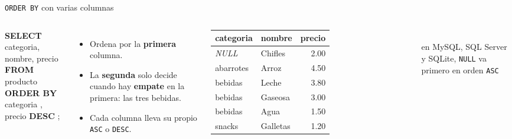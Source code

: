 \documentclass[aspectratio=169,10pt,c]{beamer}
\newcommand{\kw}[1]{\textcolor{utpRojo}{\textbf{#1}}}
\newcommand{\nuevo}[1]{{%
  \setlength{\fboxsep}{1.2pt}%
  \begingroup
  \renewcommand{\kw}[1]{\textcolor{utpNegro}{\textbf{##1}}}%
  \colorbox{yellow!45}{\textcolor{utpNegro}{#1}}%
  \endgroup}}
\newcommand{\nulo}{\textcolor{utpGrisMedio}{\textit{NULL}}}
\newenvironment{sqlcode}[1][.86\textwidth]
  {\begin{center}\begin{lrbox}{\sqlbuf}\begin{minipage}{#1}\ttfamily\footnotesize\vspace{6pt}\raggedright}
  {\vspace{6pt}\end{minipage}\end{lrbox}\colorbox{utpGrisClaro}{\usebox{\sqlbuf}}\end{center}}
\begin{document}
\begin{frame}{\texttt{ORDER BY} con varias columnas}
\begin{columns}[c,onlytextwidth]
\begin{sqlcode}[\textwidth]
\scriptsize
\kw{SELECT} categoria, nombre, precio\\
\kw{FROM} producto\\
\kw{ORDER BY} \nuevo{categoria}, \nuevo{precio \kw{DESC}};
\end{sqlcode}
\vspace{-0.1cm}
\small
\begin{itemize}\setlength\itemsep{4pt}
  \item Ordena por la \textbf{primera} columna.
  \item La \textbf{segunda} solo decide cuando hay \textbf{empate} en la primera: las tres bebidas.
  \item Cada columna lleva su propio \texttt{ASC} o \texttt{DESC}.
\end{itemize}
\centering\scriptsize\ttfamily
\begin{tabular}{llr}
\toprule
\normalfont\bfseries categoria & \normalfont\bfseries nombre & \normalfont\bfseries precio \\
\midrule
\nulo & Chifles & 2.00 \\
abarrotes & Arroz & 4.50 \\
bebidas & Leche & \nuevo{3.80} \\
bebidas & Gaseosa & \nuevo{3.00} \\
bebidas & Agua & \nuevo{1.50} \\
snacks & Galletas & 1.20 \\
\bottomrule
\end{tabular}\\[4pt]
\normalfont\tiny\color{utpGris}en MySQL, SQL Server y SQLite, \texttt{NULL} va primero en orden \texttt{ASC}
\end{columns}
\vspace{0.3cm}
\end{frame}
\end{document}
